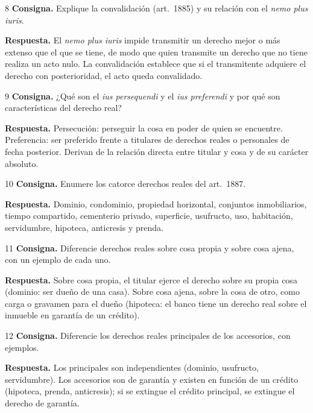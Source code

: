 \documentclass[12pt,oneside]{book}
\begin{document}
\begin{ejercicio}{8}
\textbf{Consigna.} Explique la convalidación (art.~1885) y su relación con el \textit{nemo plus iuris}.

\textbf{Respuesta.} El \textit{nemo plus iuris} impide transmitir un derecho mejor o más extenso que el que se tiene, de modo que quien transmite un derecho que no tiene realiza un acto nulo. La convalidación establece que si el transmitente adquiere el derecho con posterioridad, el acto queda convalidado.
\end{ejercicio}

\begin{ejercicio}{9}
\textbf{Consigna.} ¿Qué son el \textit{ius persequendi} y el \textit{ius preferendi} y por qué son características del derecho real?

\textbf{Respuesta.} Persecución: perseguir la cosa en poder de quien se encuentre. Preferencia: ser preferido frente a titulares de derechos reales o personales de fecha posterior. Derivan de la relación directa entre titular y cosa y de su carácter absoluto.
\end{ejercicio}

\begin{ejercicio}{10}
\textbf{Consigna.} Enumere los catorce derechos reales del art.~1887.

\textbf{Respuesta.} Dominio, condominio, propiedad horizontal, conjuntos inmobiliarios, tiempo compartido, cementerio privado, superficie, usufructo, uso, habitación, servidumbre, hipoteca, anticresis y prenda.
\end{ejercicio}

\begin{ejercicio}{11}
\textbf{Consigna.} Diferencie derechos reales sobre cosa propia y sobre cosa ajena, con un ejemplo de cada uno.

\textbf{Respuesta.} Sobre cosa propia, el titular ejerce el derecho sobre su propia cosa (dominio: ser dueño de una casa). Sobre cosa ajena, sobre la cosa de otro, como carga o gravamen para el dueño (hipoteca: el banco tiene un derecho real sobre el inmueble en garantía de un crédito).
\end{ejercicio}

\begin{ejercicio}{12}
\textbf{Consigna.} Diferencie los derechos reales principales de los accesorios, con ejemplos.

\textbf{Respuesta.} Los principales son independientes (dominio, usufructo, servidumbre). Los accesorios son de garantía y existen en función de un crédito (hipoteca, prenda, anticresis); si se extingue el crédito principal, se extingue el derecho de garantía.
\end{ejercicio}
\end{document}
